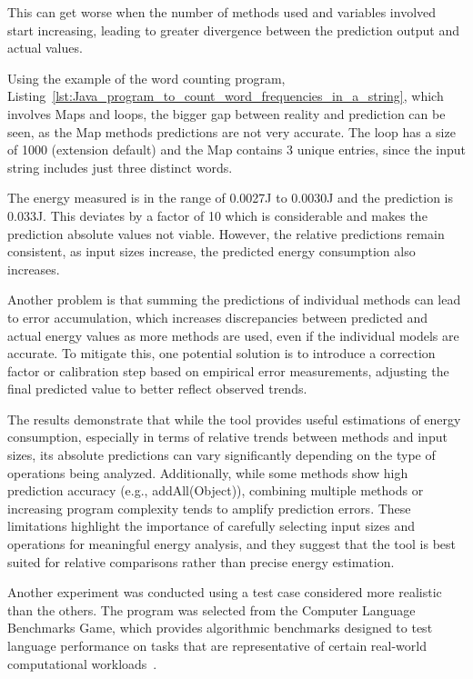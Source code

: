 This can get worse when the number of methods used and variables involved start increasing, leading to greater divergence between the prediction output and actual values. 

Using the example of the word counting program, Listing~\ref{lst:Java_program_to_count_word_frequencies_in_a_string}, which involves Maps and loops, the bigger gap between reality and prediction can be seen, as the Map methods predictions are not very accurate. The loop has a size of 1000 (extension default) and the Map contains 3 unique entries, since the input string includes just three distinct words.

The energy measured is in the range of 0.0027J to 0.0030J and the prediction is 0.033J. This deviates by a factor of 10 which is considerable and makes the prediction absolute values not viable. However, the relative predictions remain consistent, as input sizes increase, the predicted energy consumption also increases.

Another problem is that summing the predictions of individual methods can lead to error accumulation, which increases discrepancies between predicted and actual energy values as more methods are used, even if the individual models are accurate. To mitigate this, one potential solution is to introduce a correction factor or calibration step based on empirical error measurements, adjusting the final predicted value to better reflect observed trends.

The results demonstrate that while the tool provides useful estimations of energy consumption, especially in terms of relative trends between methods and input sizes, its absolute predictions can vary significantly depending on the type of operations being analyzed. Additionally, while some methods show high prediction accuracy (e.g., addAll(Object)), combining multiple methods or increasing program complexity tends to amplify prediction errors. These limitations highlight the importance of carefully selecting input sizes and operations for meaningful energy analysis, and they suggest that the tool is best suited for relative comparisons rather than precise energy estimation.


Another experiment was conducted using a test case considered more realistic than the others. The program was selected from the Computer Language Benchmarks Game, which provides algorithmic benchmarks designed to test language performance on tasks that are representative of certain real-world computational workloads~\cite{benchmarksGameJava}.

